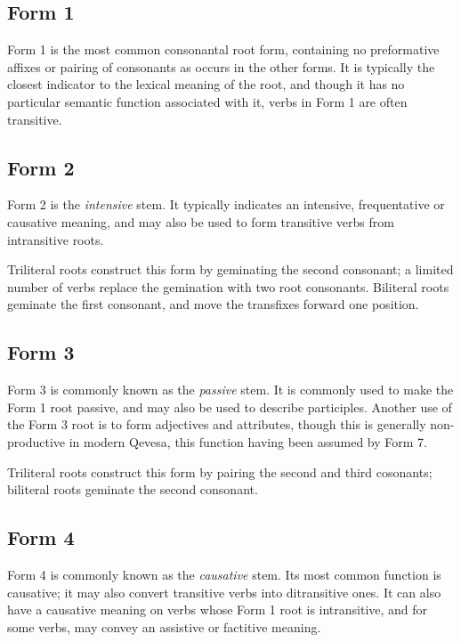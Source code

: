 \documentclass[grammar]{subfiles}
\begin{document}
  \subsection{Form 1}
  \label{ssec:dev_verb_form_1}

  Form 1 is the most common consonantal root form, containing no preformative affixes or pairing of consonants as occurs in the other forms.  It is typically the closest indicator to the lexical meaning of the root, and though it has no particular semantic function associated with it, verbs in Form 1 are often transitive.

  \subsection{Form 2}
  \label{ssec:dev_verb_form_2}

  Form 2 is the \emph{intensive} stem.  It typically indicates an intensive, frequentative or causative meaning, and may also be used to form transitive verbs from intransitive roots. 

  Triliteral roots construct this form by geminating the second consonant; a limited number of verbs replace the gemination with two root consonants.  %
  Biliteral roots geminate the first consonant, and move the transfixes forward one position. 

  \subsection{Form 3}
  \label{ssec:dev_verb_form_3}

  Form 3 is commonly known as the \emph{passive} stem.
  It is commonly used to make the Form 1 root passive, and may also be used to describe participles.
  Another use of the Form 3 root is to form adjectives and attributes, though this is generally non-productive in modern Qevesa, this function having been assumed by Form 7.

  Triliteral roots construct this form by pairing the second and third cosonants; biliteral roots geminate the second consonant.

  \subsection{Form 4}
  \label{ssec:dev_verb_form_4}

  Form 4 is commonly known as the \emph{causative} stem. 
  Its most common function is causative; it may also convert transitive verbs into ditransitive ones.
  It can also have a causative meaning on verbs whose Form 1 root is intransitive, and for some verbs, may convey an assistive or factitive meaning.
\end{document}
